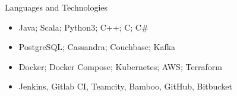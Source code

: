 \documentclass[]{cv}
\begin{document}
	\begin{cvsection}{Languages and Technologies}
		\begin{cvsubsection}{}{}{}
			\begin{itemize}
				\item Java; Scala; Python3; C++; C; C\#
				\item PostgreSQL; Cassandra; Couchbase; Kafka
				\item Docker; Docker Compose; Kubernetes; AWS; Terraform
				\item Jenkins, Gitlab CI, Teamcity, Bamboo, GitHub, Bitbucket
			\end{itemize}
		\end{cvsubsection}
	\end{cvsection}
\end{document}
